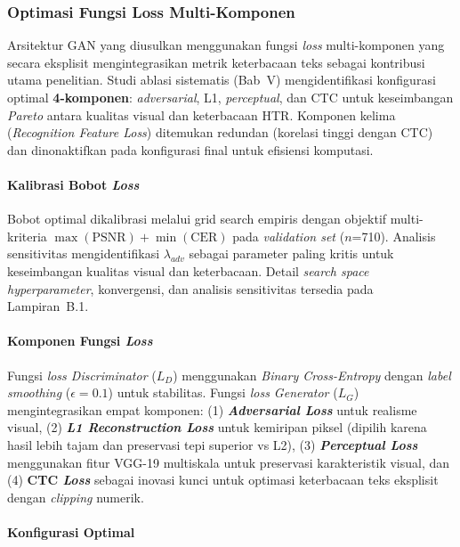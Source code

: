 \documentclass[12pt,a4paper]{book}
\begin{document}
\subsubsection{Optimasi Fungsi Loss Multi-Komponen} %

Arsitektur GAN yang diusulkan menggunakan fungsi \textit{loss} multi-komponen yang secara eksplisit mengintegrasikan metrik keterbacaan teks sebagai kontribusi utama penelitian. Studi ablasi sistematis (Bab~V) mengidentifikasi konfigurasi optimal \textbf{4-komponen}: \textit{adversarial}, L1, \textit{perceptual}, dan CTC untuk keseimbangan \textit{Pareto} antara kualitas visual dan keterbacaan HTR. Komponen kelima (\textit{Recognition Feature Loss}) ditemukan redundan (korelasi tinggi dengan CTC) dan dinonaktifkan pada konfigurasi final untuk efisiensi komputasi.

\paragraph{Kalibrasi Bobot \textit{Loss}}

Bobot optimal dikalibrasi melalui grid search empiris dengan objektif multi-kriteria $\max(\text{PSNR}) + \min(\text{CER})$ pada \textit{validation set} ($n$=710). Analisis sensitivitas mengidentifikasi $\lambda_{adv}$ sebagai parameter paling kritis untuk keseimbangan kualitas visual dan keterbacaan. Detail \textit{search space hyperparameter}, konvergensi, dan analisis sensitivitas tersedia pada Lampiran~B.1.

\paragraph{Komponen Fungsi \textit{Loss}}

Fungsi \textit{loss Discriminator} ($L_D$) menggunakan \textit{Binary Cross-Entropy} dengan \textit{label smoothing} ($\epsilon=0.1$) untuk stabilitas. Fungsi \textit{loss Generator} ($L_G$) mengintegrasikan empat komponen: (1) \textbf{\textit{Adversarial Loss}} untuk realisme visual, (2) \textbf{\textit{L1 Reconstruction Loss}} untuk kemiripan piksel (dipilih karena hasil lebih tajam dan preservasi tepi superior vs L2), (3) \textbf{\textit{Perceptual Loss}} menggunakan fitur VGG-19 multiskala untuk preservasi karakteristik visual, dan (4) \textbf{CTC \textit{Loss}} sebagai inovasi kunci untuk optimasi keterbacaan teks eksplisit dengan \textit{clipping} numerik.

\paragraph{Konfigurasi Optimal}
\end{document}
